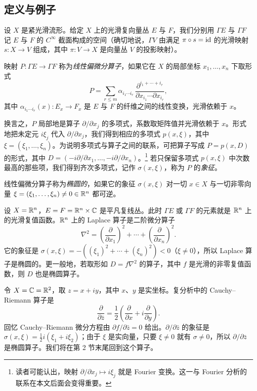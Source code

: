 \subsection{定义与例子}

设 $X$ 是紧光滑流形。给定 $X$ 上的光滑复向量丛 $E$ 与 $F$，我们分别用 $\Gamma E$ 与 $\Gamma F$ 记 $E$ 与 $F$ 的 $C^\infty$ 截面构成的空间（确切地说，$\Gamma V$ 由满足 $\pi\circ s=\mathrm{id}$ 的光滑映射 $s:X\to V$ 组成，其中 $\pi:V\to X$ 是向量丛 $V$ 的投影映射）。

\begin{definition}
映射 $P:\Gamma E\to\Gamma F$ 称为\emph{线性偏微分算子}，如果它在 $X$ 的局部坐标 $x_1,\dots,x_n$ 下取形式
\[
P=\sum_{r\le m}\alpha_{i_1\cdots i_r}\,
\frac{\partial^{i_1+\cdots+i_r}}{\partial x_{i_1}\cdots\partial x_{i_r}},
\]
其中 $\alpha_{i_1\cdots i_r}(x):E_x\to F_x$ 是 $E$ 与 $F$ 的纤维之间的线性变换，光滑依赖于 $x$。
\end{definition}

换言之，$P$ 局部地是算子 $\partial/\partial x_j$ 的多项式，系数取矩阵值并光滑依赖于 $x$。形式地把未定元 $i\xi_j$ 代入 $\partial/\partial x_j$，我们得到相应的多项式 $p(x,\xi)$，其中 $\xi=(\xi_1,\dots,\xi_n)$。为说明多项式与算子之间的联系，可把算子写成 $P=p(x,D)$ 的形式，其中 $D=(-i\partial/\partial x_1,\dots,-i\partial/\partial x_n)$。\footnote{读者可能认出，映射 $\partial/\partial x_j\mapsto i\xi_j$ 就是 Fourier 变换。这一与 Fourier 分析的联系在本文后面会变得重要。} 若只保留多项式 $p(x,\xi)$ 中次数最高的那些项，我们得到齐次多项式，记作 $\sigma(x,\xi)$，称为 $P$ 的\emph{象征}。

\begin{definition}
线性偏微分算子称为\emph{椭圆的}，如果它的象征 $\sigma(x,\xi)$ 对一切 $x\in X$ 与一切非零向量 $\xi=(\xi_1,\dots,\xi_n)\neq0\in\mathbb{R}^n$ 都可逆。
\end{definition}

\begin{example}
设 $X=\mathbb{R}^n$，$E=F=\mathbb{R}^n\times\mathbb{C}$ 是平凡复线丛。此时 $\Gamma E$ 或 $\Gamma F$ 的元素就是 $\mathbb{R}^n$ 上的光滑复值函数。$\mathbb{R}^n$ 上的 Laplace 算子是二阶微分算子
\[
\nabla^2=\left(\frac{\partial}{\partial x_1}\right)^2+\cdots+\left(\frac{\partial}{\partial x_n}\right)^2 .
\]
它的象征是 $\sigma(x,\xi)=-\left((\xi_1)^2+\cdots+(\xi_n)^2\right)<0$（$\xi\neq0$），所以 Laplace 算子是椭圆的。更一般地，若取形如 $D=f\nabla^2$ 的算子，其中 $f$ 是光滑的非零复值函数，则 $D$ 也是椭圆算子。
\end{example}

\begin{example}
令 $X=\mathbb{C}=\mathbb{R}^2$，取 $z=x+iy$，其中 $x$、$y$ 是实坐标。复分析中的 Cauchy--Riemann 算子是
\[
\frac{\partial}{\partial\bar z}=\frac12\left(\frac{\partial}{\partial x}
+i\frac{\partial}{\partial y}\right).
\]
回忆 Cauchy--Riemann 微分方程由 $\partial f/\partial\bar z=0$ 给出。$\partial/\partial\bar z$ 的象征是 $\sigma(x,\xi)=\frac12 i(\xi_1+i\xi_2)$；由于 $\xi$ 是实向量，只要 $\xi\neq0$ 就有 $\sigma\neq0$，所以 $\partial/\partial\bar z$ 是椭圆算子。我们将在第 2 节末尾回到这个算子。
\end{example}

